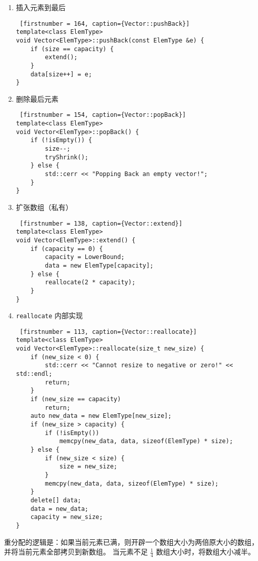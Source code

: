 {
\begin{enumerate}
      \item 插入元素到最后
\begin{lstlisting} [firstnumber = 164, caption={Vector::pushBack}]
template<class ElemType>
void Vector<ElemType>::pushBack(const ElemType &e) {
    if (size == capacity) {
        extend();
    }
    data[size++] = e;
} \end{lstlisting}
      \item 删除最后元素
\begin{lstlisting} [firstnumber = 154, caption={Vector::popBack}]
template<class ElemType>
void Vector<ElemType>::popBack() {
    if (!isEmpty()) {
        size--;
        tryShrink();
    } else {
        std::cerr << "Popping Back an empty vector!";
    }
}\end{lstlisting}

    \item 扩张数组（私有）
\begin{lstlisting} [firstnumber = 138, caption={Vector::extend}]
template<class ElemType>
void Vector<ElemType>::extend() {
    if (capacity == 0) {
        capacity = LowerBound;
        data = new ElemType[capacity];
    } else {
        reallocate(2 * capacity);
    }
}\end{lstlisting}
      

    \item \lstinline{reallocate} 内部实现
\begin{lstlisting} [firstnumber = 113, caption={Vector::reallocate}]
template<class ElemType>
void Vector<ElemType>::reallocate(size_t new_size) {
    if (new_size < 0) {
        std::cerr << "Cannot resize to negative or zero!" << std::endl;
        return;
    }
    if (new_size == capacity)
        return;
    auto new_data = new ElemType[new_size];
    if (new_size > capacity) {
        if (!isEmpty())
            memcpy(new_data, data, sizeof(ElemType) * size);
    } else {
        if (new_size < size) {
            size = new_size;
        }
        memcpy(new_data, data, sizeof(ElemType) * size);
    }
    delete[] data;
    data = new_data;
    capacity = new_size;
}\end{lstlisting}
\end{enumerate}
}

重分配的逻辑是：如果当前元素已满，则开辟一个数组大小为两倍原大小的数组，并将当前元素全部拷贝到新数组。%
当元素不足 $\frac{1}{4}$ 数组大小时，将数组大小减半。


